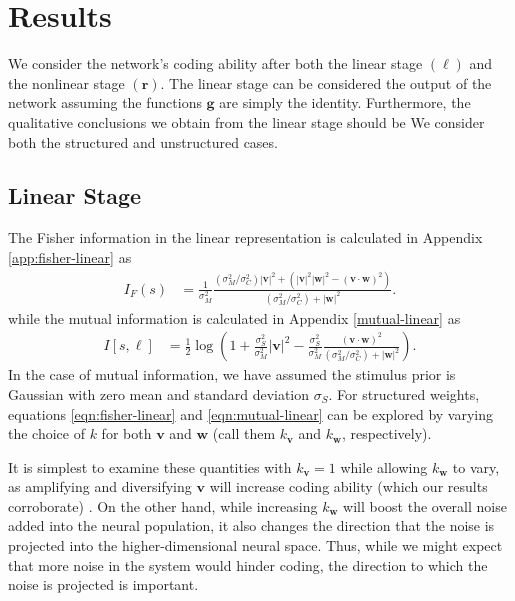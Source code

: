 \documentclass[11pt]{article}
\begin{document}
	\section{Results}
	We consider the network's coding ability after both the linear stage $(\boldsymbol{\ell})$ and the nonlinear stage $(\mathbf{r})$. The linear stage can be considered the output of the network assuming the functions $\mathbf{g}$ are simply the identity. Furthermore, the qualitative conclusions we obtain from the linear stage should be  We consider both the structured and unstructured cases.
	\subsection{Linear Stage}
	The Fisher information in the linear representation is calculated in Appendix \ref{app:fisher-linear} as 
	\begin{align}
		I_F(s) &= \frac{1}{\sigma_M^2}\frac{\left(\sigma_M^2/\sigma_C^2\right) |\mathbf{v}|^2 +  \left(|\mathbf{v}|^2|\mathbf{w}|^2 - (\mathbf{v}\cdot\mathbf{w})^2\right)}{(\sigma_M^2/\sigma_C^2)+ |\mathbf{w}|^2}. \label{eqn:fisher-linear}
	\end{align}
	while the mutual information is calculated in Appendix \ref{mutual-linear} as
	\begin{align}
		I[s, \boldsymbol{\ell}] &= \frac{1}{2} \log \left(1 + \frac{\sigma_S^2}{\sigma_M^2} |\mathbf{v}|^2 - \frac{\sigma_S^2}{\sigma_M^2} \frac{(\mathbf{v}\cdot\mathbf{w})^2}{(\sigma_M^2/\sigma_C^2) + |\mathbf{w}|^2}\right). \label{eqn:mutual-linear}
	\end{align}
	In the case of mutual information, we have assumed the stimulus prior is Gaussian with zero mean and standard deviation $\sigma_S$. For structured weights, equations \ref{eqn:fisher-linear} and \ref{eqn:mutual-linear} can be explored by varying the choice of $k$ for both $\mathbf{v}$ and $\mathbf{w}$ (call them $k_{\mathbf{v}}$ and $k_{\mathbf{w}}$, respectively).
	
	It is simplest to examine these quantities with $k_{\mathbf{v}}=1$ while allowing $k_{\mathbf{w}}$ to vary, as amplifying and diversifying $\mathbf{v}$ will increase coding ability (which our results corroborate) \cite{Ecker2011}. On the other hand, while increasing $k_{\mathbf{w}}$ will boost the overall noise added into the neural population, it also changes the direction that the noise is projected into the higher-dimensional neural space. Thus, while we might expect that more noise in the system would hinder coding, the direction to which the noise is projected is important. 
	
\end{document}
